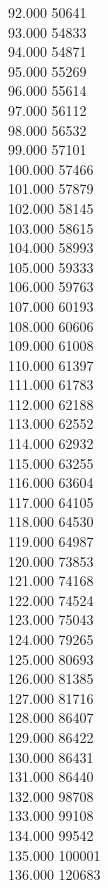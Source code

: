 { 92.000	50641 \\
 93.000	54833 \\
 94.000	54871 \\
 95.000	55269 \\
 96.000	55614 \\
 97.000	56112 \\
 98.000	56532 \\
 99.000	57101 \\
 100.000	57466 \\
 101.000	57879 \\
 102.000	58145 \\
 103.000	58615 \\
 104.000	58993 \\
 105.000	59333 \\
 106.000	59763 \\
 107.000	60193 \\
 108.000	60606 \\
 109.000	61008 \\
 110.000	61397 \\
 111.000	61783 \\
 112.000	62188 \\
 113.000	62552 \\
 114.000	62932 \\
 115.000	63255 \\
 116.000	63604 \\
 117.000	64105 \\
 118.000	64530 \\
 119.000	64987 \\
 120.000	73853 \\
 121.000	74168 \\
 122.000	74524 \\
 123.000	75043 \\
 124.000	79265 \\
 125.000	80693 \\
 126.000	81385 \\
 127.000	81716 \\
 128.000	86407 \\
 129.000	86422 \\
 130.000	86431 \\
 131.000	86440 \\
 132.000	98708 \\
 133.000	99108 \\
 134.000	99542 \\
 135.000	100001 \\
 136.000	120683 \\
}
